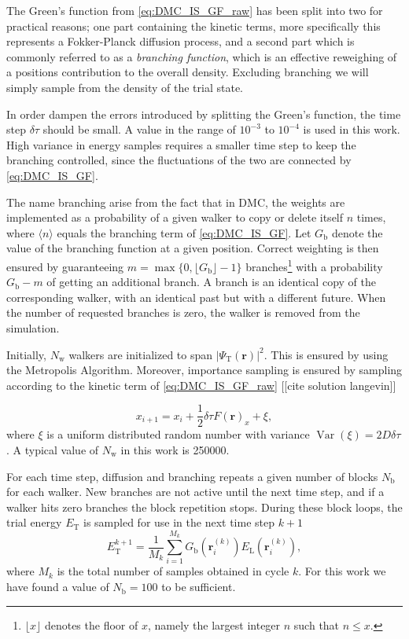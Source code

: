 The Green's function from \eqref{eq:DMC_IS_GF_raw} has been split into two for practical reasons; one part containing the kinetic terms, more specifically this represents a Fokker-Planck diffusion process, and a second part which is commonly referred to as a \textit{branching function}, which is an effective reweighing of a positions contribution to the overall density. Excluding branching we will simply sample from the density of the trial state.

In order dampen the errors introduced by splitting the Green's function, the time step $\delta\tau$ should be small. A value in the range of $10^{-3}$ to $10^{-4}$ is used in this work. High variance in energy samples requires a smaller time step to keep the branching controlled, since the fluctuations of the two are connected by \eqref{eq:DMC_IS_GF}.

The name branching arise from the fact that in DMC, the weights are implemented as a probability of a given walker to copy or delete itself $n$ times, where $\langle n \rangle$ equals the branching term of \eqref{eq:DMC_IS_GF}. Let $G_{\mathrm{b}}$ denote the value of the branching function at a given position. Correct weighting is then ensured by guaranteeing $m = \max\{0, \lfloor G_{\mathrm{b}} \rfloor - 1\}$ branches\footnote{$\lfloor x \rfloor$ denotes the floor of $x$, namely the largest integer $n$ such that $n \le x$.} with a probability $G_{\mathrm{b}} - m$ of getting an additional branch.  A branch is an identical copy of the corresponding walker, with an identical past but with a different future. When the number of requested branches is zero, the walker is removed from the simulation.


Initially, $N_{\mathrm{w}}$ walkers are initialized to span $|\Psi_{\mathrm{T}}(\bm{r})|^2$. This is ensured by using the Metropolis Algorithm. Moreover, importance sampling is ensured by sampling according to the kinetic term of \eqref{eq:DMC_IS_GF_raw} [[cite solution langevin]]

\begin{equation}
x_{i+1} = x_i + \frac{1}{2} \delta \tau F(\bm{r})_x + \xi,
\end{equation}
where $\xi$ is a uniform distributed random number with variance $\operatorname{Var}(\xi) = 2D\delta\tau$. A typical value of $N_{\mathrm{w}}$ in this work is \num{250000}.

For each time step, diffusion and branching repeats a given number of blocks $N_{\mathrm{b}}$ for each walker. New branches are not active until the next time step, and if a walker hits zero branches the block repetition stops. During these block loops, the trial energy $E_{\mathrm{T}}$ is sampled for use in the next time step $k+1$
\begin{equation}
 E_{\mathrm{T}}^{k+1} = \frac{1}{M_k}\sum_{i=1}^{M_k} G_{\mathrm{b}}(\bm{r}^{(k)}_i)E_{\mathrm{L}}(\bm{r}^{(k)}_i),
\end{equation}
where $M_k$ is the total number of samples obtained in cycle $k$. For this work we have found a value of $N_{\mathrm{b}} = 100$ to be sufficient.

